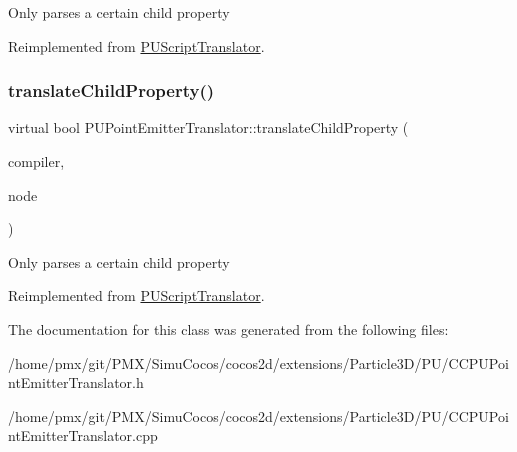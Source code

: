 Only parses a certain child property 

Reimplemented from \hyperlink{classPUScriptTranslator_a0374d83a8a04e57918975d525e0f8fe8}{P\+U\+Script\+Translator}.

\mbox{\label{classPUPointEmitterTranslator_a2d4f2b5db5a8b3f54af436ff2f284a2b}} 
\subsubsection{\texorpdfstring{translate\+Child\+Property()}{translateChildProperty()}\hspace{0.1cm}{\footnotesize\ttfamily [2/2]}}
{\footnotesize\ttfamily virtual bool P\+U\+Point\+Emitter\+Translator\+::translate\+Child\+Property (\begin{DoxyParamCaption}\item[{\hyperlink{classPUScriptCompiler}{P\+U\+Script\+Compiler} $\ast$}]{compiler,  }\item[{\hyperlink{classPUAbstractNode}{P\+U\+Abstract\+Node} $\ast$}]{node }\end{DoxyParamCaption})\hspace{0.3cm}{\ttfamily [virtual]}}

Only parses a certain child property 

Reimplemented from \hyperlink{classPUScriptTranslator_a0374d83a8a04e57918975d525e0f8fe8}{P\+U\+Script\+Translator}.



The documentation for this class was generated from the following files\+:\begin{DoxyCompactItemize}
\item 
/home/pmx/git/\+P\+M\+X/\+Simu\+Cocos/cocos2d/extensions/\+Particle3\+D/\+P\+U/C\+C\+P\+U\+Point\+Emitter\+Translator.\+h\item 
/home/pmx/git/\+P\+M\+X/\+Simu\+Cocos/cocos2d/extensions/\+Particle3\+D/\+P\+U/C\+C\+P\+U\+Point\+Emitter\+Translator.\+cpp\end{DoxyCompactItemize}
